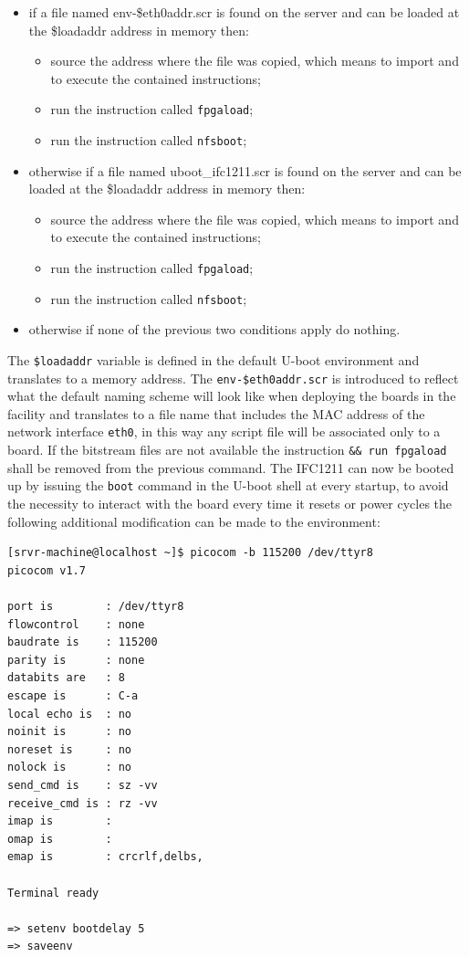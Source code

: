 \documentclass[11pt
  , a4paper
  , article
  , oneside
  , showtrims
]{memoir}
\begin{document}
\begin{itemize}
	\item if a file named env-\$eth0addr.scr is found on the server and can be loaded at the \$loadaddr address in memory then:
	\begin{itemize}
		\item source the address where the file was copied, which means to import and to execute the contained instructions;
		\item run the instruction called \texttt{fpgaload};
		\item run the instruction called \texttt{nfsboot};
	\end{itemize}
	\item otherwise if a file named uboot\_ifc1211.scr is found on the server and can be loaded at the \$loadaddr address in memory then:
	\begin{itemize}
		\item source the address where the file was copied, which means to import and to execute the contained instructions;
		\item run the instruction called \texttt{fpgaload};
		\item run the instruction called \texttt{nfsboot};
	\end{itemize}
	\item otherwise if none of the previous two conditions apply do nothing.
\end{itemize}

The \texttt{\$loadaddr} variable is defined in the default U-boot environment and translates to a memory address.
The \texttt{env-\$eth0addr.scr} is introduced to reflect what the default naming scheme will look like when deploying the boards in the facility and translates to a file name that includes the MAC address of the network interface \texttt{eth0}, in this way any script file will be associated only to a board.
If the bitstream files are not available the instruction \texttt{\&\& run fpgaload} shall be removed from the previous command.
The IFC1211 can now be booted up by issuing the \texttt{boot} command in the U-boot shell at every startup, to avoid the necessity to interact with the board every time it resets or power cycles the following additional modification can be made to the environment: 

\begin{lstlisting}[style=termstyle]
[srvr-machine@localhost ~]$ picocom -b 115200 /dev/ttyr8
picocom v1.7

port is        : /dev/ttyr8
flowcontrol    : none
baudrate is    : 115200
parity is      : none
databits are   : 8
escape is      : C-a
local echo is  : no
noinit is      : no
noreset is     : no
nolock is      : no
send_cmd is    : sz -vv
receive_cmd is : rz -vv
imap is        : 
omap is        : 
emap is        : crcrlf,delbs,

Terminal ready

=> setenv bootdelay 5
=> saveenv
\end{lstlisting}
\end{document}
